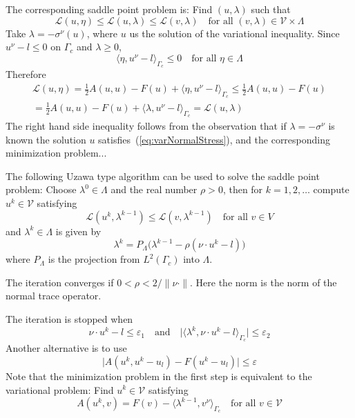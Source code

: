 \documentclass[12pt,a4paper]{article}
\numberwithin{equation}{section}
\numberwithin{table}{section}
\numberwithin{figure}{section}
\newcommand{\half}{\ensuremath{\frac{1}{2}}}
\newcommand{\V}{\ensuremath{\mathcal{V}}}
\newcommand{\Lagrange}{\ensuremath{\mathcal L}}
\renewcommand{\epsilon}{\varepsilon}
\providecommand{\abs}[1]{\lvert #1 \rvert}
\providecommand{\norm}[1]{\lVert #1 \rVert}
\providecommand{\dualp}[2]{\langle #1, #2 \rangle}
\newcommand{\qforall}{\quad\text{for all }}
\begin{document}
The corresponding saddle point problem is: Find $(u,\lambda)$ such that
\begin{equation}
  \Lagrange(u,\eta) \le \Lagrange(u,\lambda) \le \Lagrange(v,\lambda)
  \qforall (v,\lambda) \in \V\times\Lambda
\end{equation}
Take $\lambda = -\sigma^\nu(u)$, where $u$ us the solution of the variational inequality.
Since $u^\nu -l \le 0$ on $\Gamma_c$ and $\lambda \ge 0$,
\begin{equation}
  \dualp{\eta}{u^\nu - l}_{\Gamma_c} \le 0 \qforall \eta\in \Lambda
\end{equation}
Therefore
\begin{multline}
  \Lagrange(u,\eta) = \half A(u,u) - F(u) + \dualp{\eta}{u^\nu - l}_{\Gamma_c}
  \le \half A(u,u) - F(u) \\
  = \half A(u,u) - F(u) + \dualp{\lambda}{u^\nu - l}_{\Gamma_c}
  = \Lagrange(u,\lambda)
\end{multline}
The right hand side inequality follows from the observation that if $\lambda=-\sigma^\nu$
is known the solution $u$ satisfies~(\ref{eq:varNormalStress}), and the corresponding
minimization problem...

The following Uzawa type algorithm can be used to solve the saddle point problem: Choose
$\lambda^0 \in \Lambda$ and the real number $\rho > 0$, then for $k=1,2,\ldots$ compute
$u^k\in\V$ satisfying
\begin{equation}
  \Lagrange(u^k, \lambda^{k-1}) \le \Lagrange(v, \lambda^{k-1})
  \qforall v \in V
\end{equation}
and $\lambda^k\in \Lambda$ is given by
\begin{equation}
  \lambda^k = P_\Lambda \bigl(\lambda^{k-1} - \rho (\nu\cdot u^k - l) \bigr)
\end{equation}
where $P_\Lambda$ is the projection from $L^2(\Gamma_c)$ into $\Lambda$.

The iteration converges if $0 < \rho < 2/\norm{\nu\cdot}$. Here the
norm is the norm of the normal trace operator.

The iteration is stopped when
\begin{equation}
  \nu\cdot u^k -l \le \epsilon_1 \quad\text{and}\quad
  \abs{\dualp{\lambda^k}{\nu\cdot u^k -l}_{\Gamma_c}} \le \epsilon_2 
\end{equation}
Another alternative is to use
\begin{equation}
  \abs{A(u^k, u^k-u_l) - F(u^k - u_l)} \le \epsilon
\end{equation}
Note that the minimization problem in the first step is equivalent to the variational
problem: Find $u^k\in \V$ satisfying
\begin{equation}
  A(u^k, v) = F(v) - \dualp{\lambda^{k-1}}{v^\nu}_{\Gamma_c}
  \qforall v\in \V
\end{equation}
\end{document}
